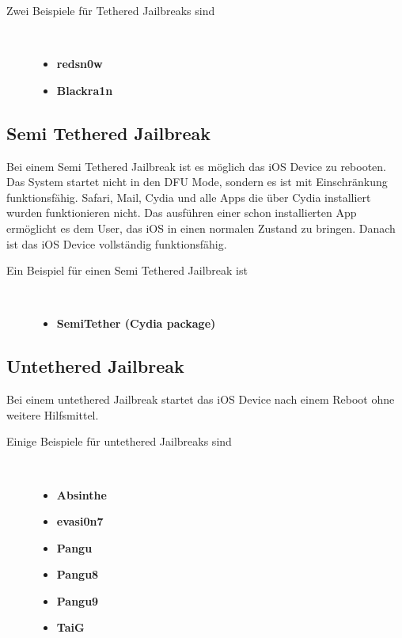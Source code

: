 \begin{description}
\item[Zwei Beispiele für \glqq Tethered Jailbreaks\grqq{} sind]~\par
	\begin{itemize}
        \item \textbf{redsn0w}
        \item \textbf{Blackra1n}
    \end{itemize}
\end{description} 

\subsection{Semi Tethered Jailbreak}
\label{sec:JBSemiTethered}

Bei einem \glqq Semi Tethered Jailbreak\grqq{} ist es möglich das iOS Device
zu rebooten. Das System startet nicht in den DFU Mode, sondern es ist
mit Einschränkung funktionsfähig. Safari, Mail, Cydia und alle Apps die über
Cydia installiert wurden funktionieren nicht. Das ausführen einer schon
installierten App ermöglicht es dem User, das iOS in einen normalen Zustand zu
bringen. Danach ist das iOS Device vollständig funktionsfähig.

\begin{description}
\item[Ein Beispiel für einen \glqq Semi Tethered Jailbreak\grqq{} ist]~\par
	\begin{itemize}
        \item \textbf{SemiTether (Cydia package)}
    \end{itemize}
\end{description} 

\subsection{Untethered Jailbreak}
\label{sec:JBUntethered}

Bei einem \glqq untethered Jailbreak\grqq{} startet das iOS Device nach einem
Reboot ohne weitere Hilfsmittel.  
\begin{description}
\item[Einige Beispiele für \glqq untethered Jailbreaks\grqq{} sind]~\par
	\begin{multicols}{2}
	\begin{itemize}
        \item \textbf{Absinthe}
        \item \textbf{evasi0n7}
        \item \textbf{Pangu}
        \item \textbf{Pangu8}
        \item \textbf{Pangu9}
        \item \textbf{TaiG}
    \end{itemize}
    \end{multicols}
\end{description} 

